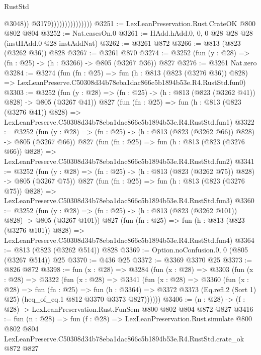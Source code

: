\begin{lexlean}{RustStd}
\begin{coremodule}
                                      @3048))
                                  @3179)))))))))))))))
@3251 := LexLeanPreservation.Rust.CrateOK @800 @802 @804
@3252 := Nat.casesOn.{0}
@3261 := HAdd.hAdd.{0, 0, 0} @28 @28 @28 (instHAdd.{0} @28 instAddNat)
@3262 := @3261 @872
@3266 := @813 (@823 (@3262 @36)) @828
@3267 := @3261 @870
@3274 := @3252 (fun (y : @28) => (fn : @25) -> (h : @3266) -> @805 (@3267 @36)) @827
@3276 := @3261 Nat.zero
@3284 := @3274
    (fun (fn : @25) =>
    fun (h : @813 (@823 (@3276 @36)) @828) =>
    LexLeanPreserve.C50308d34b78eba1dac866c5b1894b53e.R4.RustStd.fun0)
@3303 := @3252
    (fun (y : @28) => (fn : @25) -> (h : @813 (@823 (@3262 @41)) @828) -> @805 (@3267 @41))
    @827
    (fun (fn : @25) =>
    fun (h : @813 (@823 (@3276 @41)) @828) =>
    LexLeanPreserve.C50308d34b78eba1dac866c5b1894b53e.R4.RustStd.fun1)
@3322 := @3252
    (fun (y : @28) => (fn : @25) -> (h : @813 (@823 (@3262 @66)) @828) -> @805 (@3267 @66))
    @827
    (fun (fn : @25) =>
    fun (h : @813 (@823 (@3276 @66)) @828) =>
    LexLeanPreserve.C50308d34b78eba1dac866c5b1894b53e.R4.RustStd.fun2)
@3341 := @3252
    (fun (y : @28) => (fn : @25) -> (h : @813 (@823 (@3262 @75)) @828) -> @805 (@3267 @75))
    @827
    (fun (fn : @25) =>
    fun (h : @813 (@823 (@3276 @75)) @828) =>
    LexLeanPreserve.C50308d34b78eba1dac866c5b1894b53e.R4.RustStd.fun3)
@3360 := @3252
    (fun (y : @28) => (fn : @25) -> (h : @813 (@823 (@3262 @101)) @828) -> @805 (@3267 @101))
    @827
    (fun (fn : @25) =>
    fun (h : @813 (@823 (@3276 @101)) @828) =>
    LexLeanPreserve.C50308d34b78eba1dac866c5b1894b53e.R4.RustStd.fun4)
@3364 := @813 (@823 (@3262 @514)) @828
@3369 := Option.noConfusion.{0, 0} (@805 (@3267 @514)) @25
@3370 := @436 @25
@3372 := @3369 @3370 @25
@3373 := @826 @872
@3398 := fun (x : @28) =>
  @3284
    (fun (x : @28) =>
    @3303
      (fun (x : @28) =>
      @3322
        (fun (x : @28) =>
        @3341
          (fun (x : @28) =>
          @3360
            (fun (x : @28) =>
            fun (fn : @25) =>
            fun (h : @3364) =>
            @3372 @3373 (Eq.refl.{2} (Sort 1) @25) (heq_of_eq.{1} @812 @3370 @3373 @827))))))
@3406 := (n : @28) -> (f : @28) -> LexLeanPreservation.Rust.FunSem @800 @802 @804 @872 @827
@3416 := fun (n : @28) =>
  fun (f : @28) =>
  LexLeanPreservation.Rust.simulate
    @800
    @802
    @804
    LexLeanPreserve.C50308d34b78eba1dac866c5b1894b53e.R4.RustStd.crate_ok
    @872
    @827
\end{coremodule}
\end{lexlean}

